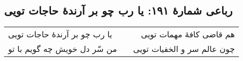 \begin{center}
\section*{رباعی شمارهٔ ۱۹۱: یا رب چو بر آرندۀ حاجات تویی}
\label{sec:191}
\begin{longtable}{l p{0.5cm} r}
یا رب چو بر آرندهٔ حاجات تویی
&&
هم قاضی کافهٔ مهمات تویی
\\
من سّر دل خویش چه گویم با تو
&&
چون عالم سر و الخفیات تویی
\\
\end{longtable}
\end{center}
